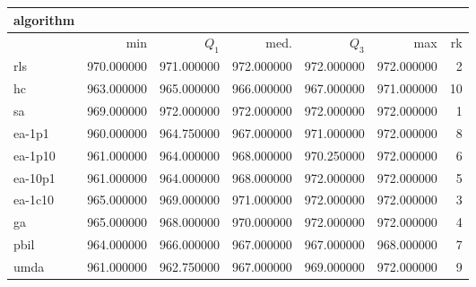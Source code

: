 \begin{tabular}{@{}l*{5}{>{{}}N{3}{0}}>{{}}N{2}{0}@{}}
\toprule
{algorithm} &  \\
\midrule
& {min} & {$Q_1$} & {med.} & {$Q_3$} & {max} & {rk}\\
\midrule
rls & {\color{blue}} 970.000000 & 971.000000 & {\color{blue}} 972.000000 & {\color{blue}} 972.000000 & {\color{blue}} 972.000000 & 2\\
hc & 963.000000 & 965.000000 & 966.000000 & 967.000000 & 971.000000 & 10\\
sa & 969.000000 & {\color{blue}} 972.000000 & {\color{blue}} 972.000000 & {\color{blue}} 972.000000 & {\color{blue}} 972.000000 & 1\\
ea-1p1 & 960.000000 & 964.750000 & 967.000000 & 971.000000 & {\color{blue}} 972.000000 & 8\\
ea-1p10 & 961.000000 & 964.000000 & 968.000000 & 970.250000 & {\color{blue}} 972.000000 & 6\\
ea-10p1 & 961.000000 & 964.000000 & 968.000000 & {\color{blue}} 972.000000 & {\color{blue}} 972.000000 & 5\\
ea-1c10 & 965.000000 & 969.000000 & 971.000000 & {\color{blue}} 972.000000 & {\color{blue}} 972.000000 & 3\\
ga & 965.000000 & 968.000000 & 970.000000 & {\color{blue}} 972.000000 & {\color{blue}} 972.000000 & 4\\
pbil & 964.000000 & 966.000000 & 967.000000 & 967.000000 & 968.000000 & 7\\
umda & 961.000000 & 962.750000 & 967.000000 & 969.000000 & {\color{blue}} 972.000000 & 9\\
\bottomrule
\end{tabular}
